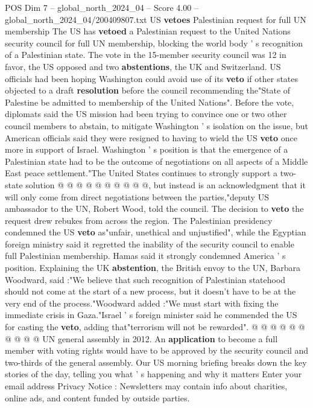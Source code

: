 \begin{textsample}{POS Dim 7 – global\_north\_2024\_04 – Score 4.00 – global\_north\_2024\_04/200409807.txt}  \label{ex:f7_pos_220}
US \textbf{vetoes} Palestinian request for full UN membership The US has \textbf{vetoed} a Palestinian request to the United Nations security council for full UN membership, blocking the world body ' s recognition of a Palestinian state.
The vote in the 15-member security council was 12 in favor, the US opposed and two \textbf{abstentions}, the UK and Switzerland.
US officials had been hoping Washington could avoid use of its \textbf{veto} if other states objected to a draft \textbf{resolution} before the council recommending the"State of Palestine be admitted to membership of the United Nations".
Before the vote, diplomats said the US mission had been trying to convince one or two other council members to abstain, to mitigate Washington ' s isolation on the issue, but American officials said they were resigned to having to wield the US \textbf{veto} once more in support of Israel.
Washington ' s position is that the emergence of a Palestinian state had to be the outcome of negotiations on all aspects of a Middle East peace settlement."The United States continues to strongly support a two-state solution @ @ @ @ @ @ @ @ @ @, but instead is an acknowledgment that it will only come from direct negotiations between the parties,"deputy US ambassador to the UN, Robert Wood, told the council.
The decision to \textbf{veto} the request drew rebukes from across the region.
The Palestinian presidency condemned the US \textbf{veto} as"unfair, unethical and unjustified", while the Egyptian foreign ministry said it regretted the inability of the security council to enable full Palestinian membership.
Hamas said it strongly condemned America ' s position.
Explaining the UK \textbf{abstention}, the British envoy to the UN, Barbara Woodward, said :"We believe that such recognition of Palestinian statehood should not come at the start of a new process, but it doesn't have to be at the very end of the process."Woodward added :"We must start with fixing the immediate crisis in Gaza."Israel ' s foreign minister said he commended the US for casting the \textbf{veto}, adding that"terrorism will not be rewarded". @ @ @ @ @ @ @ @ @ @ UN general assembly in 2012.
An \textbf{application} to become a full member with voting rights would have to be approved by the security council and two-thirds of the general assembly.
Our US morning briefing breaks down the key stories of the day, telling you what ' s happening and why it matters Enter your email address Privacy Notice : Newsletters may contain info about charities, online ads, and content funded by outside parties.

\end{textsample}
